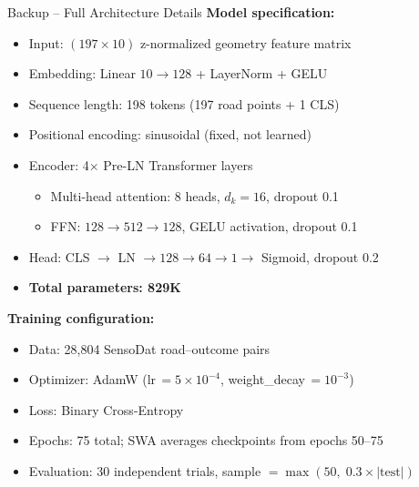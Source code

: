 \documentclass[aspectratio=169,10pt]{beamer}
\begin{document}
\begin{frame}[allowframebreaks]{Backup -- Full Architecture Details}
  \textbf{Model specification:}
  \vspace{4pt}
  \begin{itemize}
    \item Input: $(197{\times}10)$ z-normalized geometry feature matrix
    \item Embedding: Linear $10\to128$ + LayerNorm + GELU
    \item Sequence length: 198 tokens (197 road points + 1 CLS)
    \item Positional encoding: sinusoidal (fixed, not learned)
    \item Encoder: 4$\times$ Pre-LN Transformer layers
      \begin{itemize}
        \item Multi-head attention: 8 heads, $d_k=16$, dropout 0.1
        \item FFN: $128\to512\to128$, GELU activation, dropout 0.1
      \end{itemize}
    \item Head: CLS $\to$ LN $\to 128\to64\to1 \to$ Sigmoid, dropout 0.2
    \item \textbf{Total parameters: 829K}
  \end{itemize}

  \framebreak

  \textbf{Training configuration:}
  \begin{itemize}
    \item Data: 28,804 SensoDat road--outcome pairs
    \item Optimizer: AdamW (lr\,$=5{\times}10^{-4}$, weight\_decay\,$=10^{-3}$)
    \item Loss: Binary Cross-Entropy
    \item Epochs: 75 total; SWA averages checkpoints from epochs 50--75
    \item Evaluation: 30 independent trials,
          sample $= \max(50,\;0.3{\times}|\text{test}|)$
  \end{itemize}
\end{frame}
\end{document}
